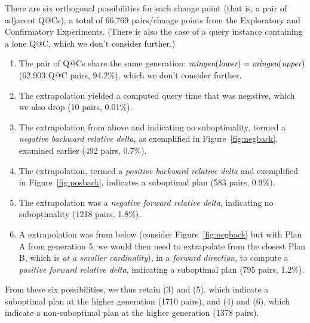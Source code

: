 \documentclass[prodmode,acmtods]{acmsmall}
\begin{document}
There are six orthogonal possibilities for each change point (that
is, a pair of adjacent Q@Cs), a total of 66,769 pairs/change
points from the Exploratory and Confirmatory Experiments. (There is also the
case of a query instance containing a lone Q@C, which we don't consider further.)

\begin{enumerate}
\item The pair of Q@Cs share the same generation: $\hbox{\em mingen}(\hbox{\em lower}) =
\hbox{\em mingen}(\hbox{\em upper})$  (62,903 Q@C pairs, 94.2\%), which we don't consider further.

\item The extrapolation yielded a computed query
time that was negative, which we also drop (10 pairs, 0.01\%).

\item The extrapolation from above and indicating
no suboptimality, termed a {\em negative backward relative
  delta}, as
  exemplified in Figure~\ref{fig:negback}, examined earlier (492 pairs,
  0.7\%).

\item The extrapolation, termed a {\em positive backward
    relative delta} and exemplified in Figure~\ref{fig:posback}, indicates
  a suboptimal plan (583 pairs, 0.9\%).

\item The extrapolation was a {\em negative forward relative delta},
  indicating no suboptimality (1218 pairs, 1.8\%).

\item A extrapolation was from below (consider Figure~\ref{fig:negback} but with
  Plan A from generation 5; we would then need to extrapolate from the
  closest Plan B, which is {\em at a smaller cardinality}), in a {\em forward
    direction}, to compute a {\em positive forward relative delta},
  indicating a suboptimal plan (795 pairs, 1.2\%).
\end{enumerate}
From these six possibilities, we thus retain (3) and (5), which indicate a
\hbox{suboptimal} plan at the higher generation (1710 pairs), and (4) and (6), which indicate a
non-suboptimal plan at the higher generation (1378 pairs).
\end{document}
